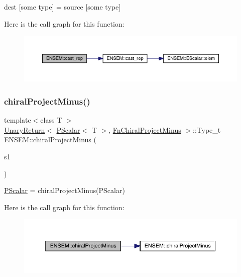dest \mbox{[}some type\mbox{]} = source \mbox{[}some type\mbox{]} 

Here is the call graph for this function\+:\nopagebreak
\begin{figure}[H]
\begin{center}
\leavevmode
\includegraphics[width=350pt]{db/dcc/group__primscalar_ga1444be24a3863d0af7a71b450500cb9d_cgraph}
\end{center}
\end{figure}
\mbox{\label{group__primscalar_ga145e49e169b22a3ded82ba8af1b15da2}} 
\subsubsection{\texorpdfstring{chiralProjectMinus()}{chiralProjectMinus()}}
{\footnotesize\ttfamily template$<$class T $>$ \\
\mbox{\hyperlink{structENSEM_1_1UnaryReturn}{Unary\+Return}}$<$ \mbox{\hyperlink{classENSEM_1_1PScalar}{P\+Scalar}}$<$ T $>$, \mbox{\hyperlink{structENSEM_1_1FnChiralProjectMinus}{Fn\+Chiral\+Project\+Minus}} $>$\+::Type\+\_\+t E\+N\+S\+E\+M\+::chiral\+Project\+Minus (\begin{DoxyParamCaption}\item[{const \mbox{\hyperlink{classENSEM_1_1PScalar}{P\+Scalar}}$<$ T $>$ \&}]{s1 }\end{DoxyParamCaption})\hspace{0.3cm}{\ttfamily [inline]}}



\mbox{\hyperlink{classENSEM_1_1PScalar}{P\+Scalar}} = chiral\+Project\+Minus(\+P\+Scalar) 

Here is the call graph for this function\+:\nopagebreak
\begin{figure}[H]
\begin{center}
\leavevmode
\includegraphics[width=350pt]{db/dcc/group__primscalar_ga145e49e169b22a3ded82ba8af1b15da2_cgraph}
\end{center}
\end{figure}
\mbox{\label{group__primscalar_ga5c2866755d31c5ec528c5763aa16a833}} 
